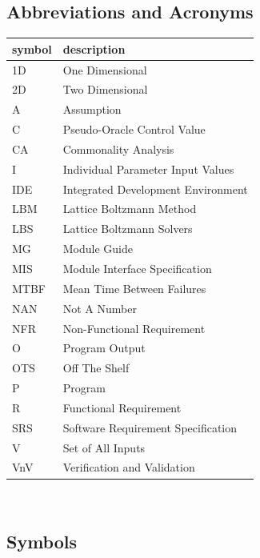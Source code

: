 \documentclass[12pt, titlepage]{article}
\begin{document}
\subsection{Abbreviations and Acronyms}
\renewcommand{\arraystretch}{1.2}
\begin{tabular}{l l} 
  \toprule		
  \textbf{symbol} & \textbf{description}\\
  \midrule 
  1D & One Dimensional\\
  2D & Two Dimensional\\
  A & Assumption\\
  C & Pseudo-Oracle Control Value\\
  CA & Commonality Analysis\\
  I & Individual Parameter Input Values\\
  IDE & Integrated Development Environment\\
  LBM & Lattice Boltzmann Method\\
  LBS & Lattice Boltzmann Solvers\\
  MG & Module Guide\\
  MIS & Module Interface Specification\\
  MTBF & Mean Time Between Failures\\
  NAN & Not A Number\\
  NFR & Non-Functional Requirement\\
  O & Program Output\\
  OTS & Off The Shelf\\
  P & Program\\
  R & Functional Requirement\\
  SRS & Software Requirement Specification\\
  V & Set of All Inputs\\
  VnV & Verification and Validation\\
  \bottomrule
\end{tabular}\\

\newpage

\subsection{Symbols}
\end{document}
